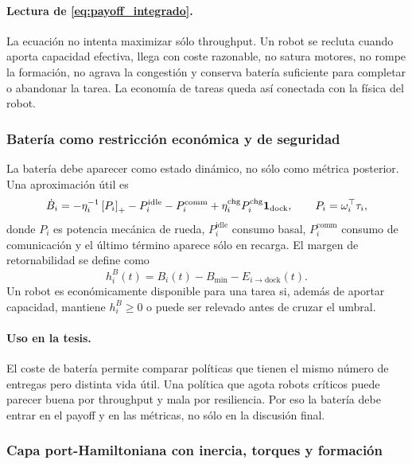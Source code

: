 \paragraph{Lectura de \eqref{eq:payoff_integrado}.}
La ecuación no intenta maximizar sólo throughput. Un robot se recluta cuando aporta
capacidad efectiva, llega con coste razonable, no satura motores, no rompe la formación,
no agrava la congestión y conserva batería suficiente para completar o abandonar la
tarea. La economía de tareas queda así conectada con la física del robot.

\subsubsection{Batería como restricción económica y de seguridad}

La batería debe aparecer como estado dinámico, no sólo como métrica posterior. Una
aproximación útil es
\begin{equation}
  \dot B_i
  =
  -\eta_i^{-1}\left[P_i\right]_{+}
  -P_i^{\mathrm{idle}}
  -P_i^{\mathrm{comm}}
  +\eta_i^{\mathrm{chg}}P_i^{\mathrm{chg}}\mathbf{1}_{\mathrm{dock}},
  \qquad
  P_i=\omega_i^\top\tau_i ,
  \label{eq:bateria_dinamica_integrada}
\end{equation}
donde $P_i$ es potencia mecánica de rueda, $P_i^{\mathrm{idle}}$ consumo basal,
$P_i^{\mathrm{comm}}$ consumo de comunicación y el último término aparece sólo en
recarga. El margen de retornabilidad se define como
\begin{equation}
  h_i^B(t)=
  B_i(t)-B_{\min}-\widehat E_{i\to\mathrm{dock}}(t).
  \label{eq:bateria_retornabilidad_integrada}
\end{equation}
Un robot es económicamente disponible para una tarea si, además de aportar capacidad,
mantiene $h_i^B\ge0$ o puede ser relevado antes de cruzar el umbral.

\paragraph{Uso en la tesis.}
El coste de batería permite comparar políticas que tienen el mismo número de entregas
pero distinta vida útil. Una política que agota robots críticos puede parecer buena por
throughput y mala por resiliencia. Por eso la batería debe entrar en el payoff y en las
métricas, no sólo en la discusión final.

\subsubsection{Capa port-Hamiltoniana con inercia, torques y formación}

